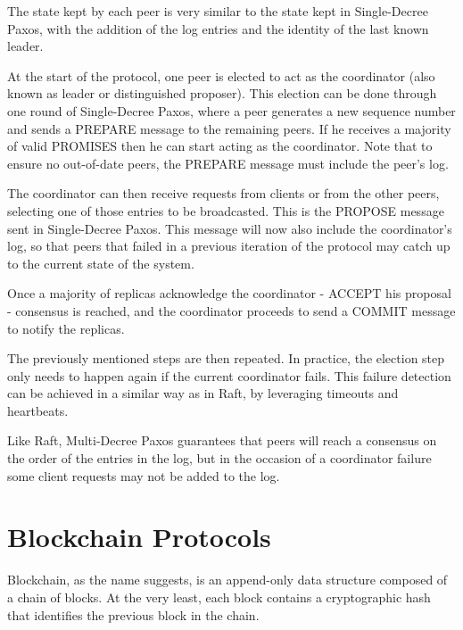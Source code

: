 The state kept by each peer is very similar to the state kept in Single-Decree Paxos, with the addition of the log entries and the identity of the last known leader.

At the start of the protocol, one peer is elected to act as the coordinator (also known as leader or distinguished proposer). This election can be done through one round of Single-Decree Paxos, where a peer generates a new sequence number and sends a PREPARE message to the remaining peers. If he receives a majority of valid PROMISES then he can start acting as the coordinator. Note that to ensure no out-of-date peers, the PREPARE message must include the peer’s log.

The coordinator can then receive requests from clients or from the other peers, selecting one of those entries to be broadcasted. This is the PROPOSE message sent in Single-Decree Paxos. This message will now also include the coordinator’s log, so that peers that failed in a previous iteration of the protocol may catch up to the current state of the system.

Once a majority of replicas acknowledge the coordinator - ACCEPT his proposal - consensus is reached, and the coordinator proceeds to send a COMMIT message to notify the replicas.

\vspace{0.5cm}

The previously mentioned steps are then repeated. In practice, the election step only needs to happen again if the current coordinator fails. This failure detection can be achieved in a similar way as in Raft, by leveraging timeouts and heartbeats.

\vspace{0.5cm}

Like Raft, Multi-Decree Paxos guarantees that peers will reach a consensus on the order of the entries in the log, but in the occasion of a coordinator failure some client requests may not be added to the log.




\section{Blockchain Protocols}

Blockchain, as the name suggests, is an append-only data structure composed of a chain of blocks. At the very least, each block contains a cryptographic hash that identifies the previous block in the chain.

\vspace{0.5cm}

